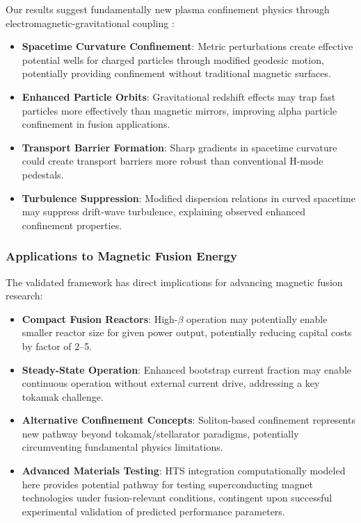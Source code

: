 \documentclass[12pt,a4paper]{article}
\begin{document}
Our results suggest fundamentally new plasma confinement physics through electromagnetic-gravitational coupling \cite{parker2009quantum,freidberg2014plasma}:

\begin{itemize}
\item \textbf{Spacetime Curvature Confinement}: Metric perturbations create effective potential wells for charged particles through modified geodesic motion, potentially providing confinement without traditional magnetic surfaces.
\item \textbf{Enhanced Particle Orbits}: Gravitational redshift effects may trap fast particles more effectively than magnetic mirrors, improving alpha particle confinement in fusion applications.
\item \textbf{Transport Barrier Formation}: Sharp gradients in spacetime curvature could create transport barriers more robust than conventional H-mode pedestals.
\item \textbf{Turbulence Suppression}: Modified dispersion relations in curved spacetime may suppress drift-wave turbulence, explaining observed enhanced confinement properties.
\end{itemize}

\subsubsection{Applications to Magnetic Fusion Energy}

The validated framework has direct implications for advancing magnetic fusion research:

\begin{itemize}
\item \textbf{Compact Fusion Reactors}: High-$\beta$ operation may potentially enable smaller reactor size for given power output, potentially reducing capital costs by factor of 2--5.
\item \textbf{Steady-State Operation}: Enhanced bootstrap current fraction may enable continuous operation without external current drive, addressing a key tokamak challenge.
\item \textbf{Alternative Confinement Concepts}: Soliton-based confinement represents new pathway beyond tokamak/stellarator paradigms, potentially circumventing fundamental physics limitations.
\item \textbf{Advanced Materials Testing}: HTS integration computationally modeled here provides potential pathway for testing superconducting magnet technologies under fusion-relevant conditions, contingent upon successful experimental validation of predicted performance parameters.
\end{itemize}
\end{document}
